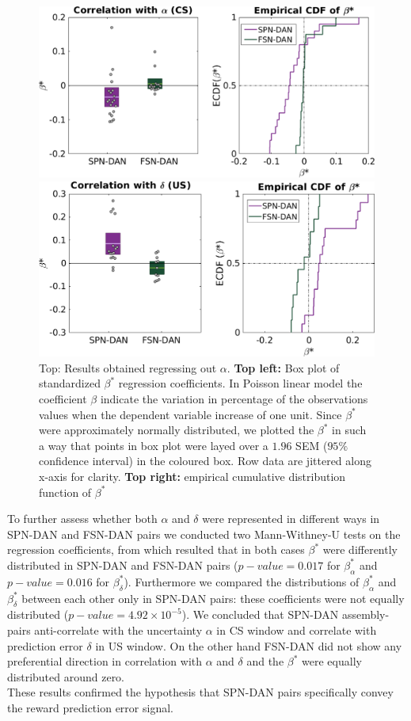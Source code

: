 \begin{figure}[H]
    \centering
    \includegraphics[scale=0.42]{figures/alphaRegrNew3.png}
    
    \vspace{1cm}
    \includegraphics[scale=0.42]{figures/deltaRegr3.png}
    \caption{Top: Results obtained regressing out $\alpha$. \textbf{Top left:} Box plot of standardized $\beta^*$ regression coefficients. In Poisson linear model the coefficient $\beta$ indicate the variation in percentage of the observations values when the dependent variable increase of one unit. Since $\beta^*$ were approximately normally distributed, we plotted the $\beta^*$ in such a way that points in box plot were layed over a $1.96$ SEM ($95\%$ confidence interval) in the coloured box. Row data are jittered along x-axis for clarity. \textbf{Top right:} empirical cumulative distribution function of $\beta^*$}
    \label{fig:AlphaDeltaReg}
\end{figure}
To further assess whether both $\alpha$ and $\delta$ were represented in different ways in SPN-DAN and FSN-DAN pairs we conducted two Mann-Withney-U tests on the regression coefficients, from which resulted that in both cases $\beta^*$ were differently distributed in SPN-DAN and FSN-DAN pairs ($p-value=0.017$ for $\beta^*_{\alpha}$ and $p-value=0.016$ for $\beta^*_{\delta}$). Furthermore we compared the distributions of $\beta^*_{\alpha}$ and $\beta^*_{\delta}$ between each other only in SPN-DAN pairs: these coefficients were not equally distributed ($p-value=4.92\times10^{-5}$). We concluded that SPN-DAN assembly-pairs anti-correlate with the uncertainty $\alpha$ in CS window and correlate with prediction error $\delta$ in US window. On the other hand FSN-DAN did not show any preferential direction in correlation with $\alpha$ and $\delta$ and the $\beta^*$ were equally distributed around zero.\\These results confirmed the hypothesis that SPN-DAN pairs specifically convey the reward prediction error signal.
